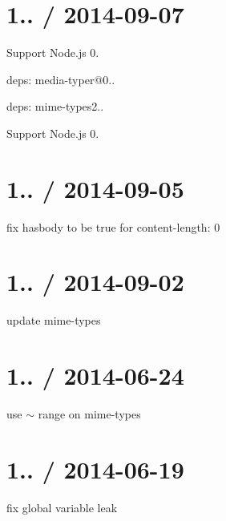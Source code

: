 \section*{1.. / 2014-\/09-\/07 }


\begin{DoxyItemize}
\item Support Node.\+js 0.
\item deps\+: media-\/typer@0..
\item deps\+: mime-\/types2..
\begin{DoxyItemize}
\item Support Node.\+js 0.
\end{DoxyItemize}
\end{DoxyItemize}

\section*{1.. / 2014-\/09-\/05 }


\begin{DoxyItemize}
\item fix {\ttfamily hasbody} to be true for {\ttfamily content-\/length\+: 0}
\end{DoxyItemize}

\section*{1.. / 2014-\/09-\/02 }


\begin{DoxyItemize}
\item update mime-\/types
\end{DoxyItemize}

\section*{1.. / 2014-\/06-\/24 }


\begin{DoxyItemize}
\item use {\ttfamily $\sim$} range on mime-\/types
\end{DoxyItemize}

\section*{1.. / 2014-\/06-\/19 }


\begin{DoxyItemize}
\item fix global variable leak
\end{DoxyItemize}

